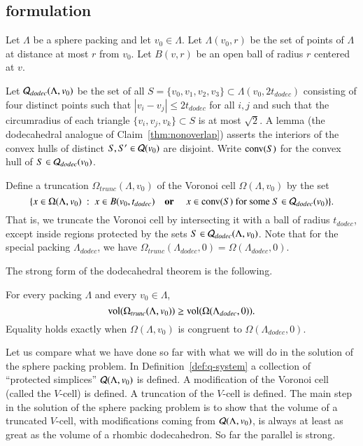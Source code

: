 \subsection{formulation}

Let $\Lambda$ be a sphere packing and let $v_0\in\Lambda$.
Let $\Lambda(v_0,r)$ be the set of points of $\Lambda$ at distance at most $r$ from $v_0$.
Let $B(v,r)$ be an open ball
of radius $r$ centered at $v$.  

Let ${\mathcal Q}_{dodec}(\Lambda,v_0)$ 
be the set of all $S=\{v_0,v_1,v_2,v_3\}\subset\Lambda(v_0,2t_{dodec})$
consisting of four distinct points such that $|v_i-v_j|\le 2t_{dodec}$ for all $i,j$
and such that the circumradius of each triangle $\{v_i,v_j,v_k\}\subset S$ is at most
$\sqrt2$.  A lemma (the dodecahedral analogue of Claim~\ref{thm:nonoverlap})
asserts the interiors of the convex hulls of distinct $S,S'\in{\mathcal Q}(v_0)$
are disjoint. Write ${\operatorname{conv}}(S)$ for the convex hull of $S\in{\mathcal Q}_{dodec}(v_0)$.

Define a truncation $\Omega_{trunc}(\Lambda,v_0)$ 
of the Voronoi cell $\Omega(\Lambda,v_0)$ by the set
   $$
   \{x \in \Omega(\Lambda,v_0) \ :\    x\in B(v_0,t_{dodec}) \quad\text{\bf  or }\quad x \in {\operatorname{conv}}(S)
     \text{ for some } S\in {\mathcal Q}_{dodec}(v_0) \}. 
   $$
That is, we truncate the Voronoi cell by intersecting it with a ball of radius $t_{dodec}$,
except inside regions protected by the sets $S\in{\mathcal Q}_{dodec}(\Lambda,v_0)$.
Note that for the special packing $\Lambda_{dodec}$, we have 
$\Omega_{trunc}(\Lambda_{dodec},0) = \Omega(\Lambda_{dodec},0)$.

The strong form of the dodecahedral theorem is the following.

\begin{theorem}
For every packing $\Lambda$ and every $v_0\in\Lambda$,
   $$
   {\operatorname{vol}}(\Omega_{trunc}(\Lambda,v_0))\ge {\operatorname{vol}}(\Omega(\Lambda_{dodec},0)).
   $$
Equality holds exactly when $\Omega(\Lambda,v_0)$ is congruent to
$\Omega(\Lambda_{dodec},0)$.
\end{theorem}

Let us compare what we have done so far with what we will do in
 the solution of the sphere packing problem. In Definition~\ref{def:q-system}
 a collection of ``protected simplices''
${\mathcal Q}(\Lambda,v_0)$ is defined.  A modification of the Voronoi cell (called the
$V$-cell) is defined.  A truncation of the $V$-cell is defined.
The main step in the solution of the sphere packing problem
is to show that the volume of a truncated $V$-cell, with modifications coming from
${\mathcal Q}(\Lambda,v_0)$, is always at least as great as the volume of a rhombic dodecahedron.
So far the parallel is strong.

